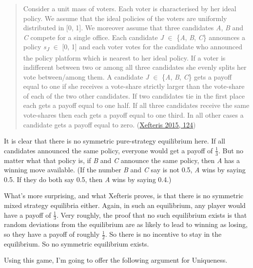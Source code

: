 \documentclass[
  12pt,
  letterpaper,
  DIV=11,
  numbers=noendperiod]{scrreprt}
\begin{document}
\begin{quote}
Consider a unit mass of voters. Each voter is characterised by her ideal
policy. We assume that the ideal policies of the voters are uniformly
distributed in {[}0, 1{]}. We moreover assume that three candidates
\emph{A}, \emph{B} and \emph{C} compete for a single office. Each
candidate \emph{J} \(\in\) \{\emph{A}, \emph{B}, \emph{C}\} announces a
policy \emph{s\textsubscript{J}} \(\in\) {[}0, 1{]} and each voter votes
for the candidate who announced the policy platform which is nearest to
her ideal policy. If a voter is indifferent between two or among all
three candidates she evenly splits her vote between/among them. A
candidate \emph{J} \(\in\) \{\emph{A}, \emph{B}, \emph{C}\} gets a
payoff equal to one if she receives a vote-share strictly larger than
the vote-share of each of the two other candidates. If two candidates
tie in the first place each gets a payoff equal to one half. If all
three candidates receive the same vote-shares then each gets a payoff
equal to one third. In all other cases a candidate gets a payoff equal
to zero. (\protect\hyperlink{ref-Xefteris2015}{Xefteris 2015, 124})
\end{quote}

It is clear that there is no symmetric pure-strategy equilibrium here.
If all candidates announced the same policy, everyone would get a payoff
of \(\frac{1}{3}\). But no matter what that policy is, if \emph{B} and
\emph{C} announce the same policy, then \emph{A} has a winning move
available. (If the number \emph{B} and \emph{C} say is not 0.5, \emph{A}
wins by saying 0.5. If they do both say 0.5, then \emph{A} wins by
saying 0.4.)

What's more surprising, and what Xefteris proves, is that there is no
symmetric mixed strategy equilibria either. Again, in such an
equilibrium, any player would have a payoff of \(\frac{1}{3}\). Very
roughly, the proof that no such equilibrium exists is that random
deviations from the equilibrium are as likely to lead to winning as
losing, so they have a payoff of roughly \(\frac{1}{2}\). So there is no
incentive to stay in the equilibrium. So no symmetric equilibrium
exists.

Using this game, I'm going to offer the following argument for
Uniqueness.
\end{document}

